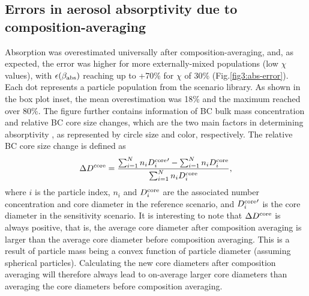 \documentclass[edeposit,fullpage]{uiucthesis2009}
\begin{document}
\subsection{Errors in aerosol absorptivity due to composition-averaging}
Absorption was overestimated universally after composition-averaging,
and, as expected, the error was higher for more externally-mixed
populations (low $\chi$ values), with $\epsilon(\beta_{\rm abs})$
reaching up to +70\% for $\chi$ of 30\%
(Fig.\ref{fig3:abs-error}). Each dot represents a particle population
from the scenario library. As shown in the box plot inset, the mean
overestimation was 18\% and the maximum reached over 80\%. The figure
further contains information of BC bulk mass concentration and
relative BC core size changes, which are the two main factors in
determining absorptivity \citep{Bond2006a}, as represented by circle
size and color, respectively. The relative BC core size change is
defined as
\begin{equation}
    \displaystyle \Delta{D^{\rm core}}=\frac{\sum_{i=1}^{N} n_i {D_i^{\rm core}}' - \sum_{i=1}^{N} n_i {D_i^{\rm core}}}{\sum_{i=1}^{N} n_i D_i^{\rm core}},
\end{equation}
where $i$ is the particle index, $n_i$ and $D_i^{\rm core}$ are the
associated number concentration and core diameter in the reference
scenario, and ${D_i^{\rm core}}'$ is the core diameter in the
sensitivity scenario. It is interesting to note that $\Delta
D^{\rm core}$ is always positive, that is, the average core diameter
after composition averaging is larger than the average core diameter
before composition averaging. This is a result of particle mass being
a convex function of particle diameter (assuming spherical
particles). Calculating the new core diameters after composition
averaging will therefore always lead to on-average larger core
diameters than averaging the core diameters before composition
averaging.
\end{document}
